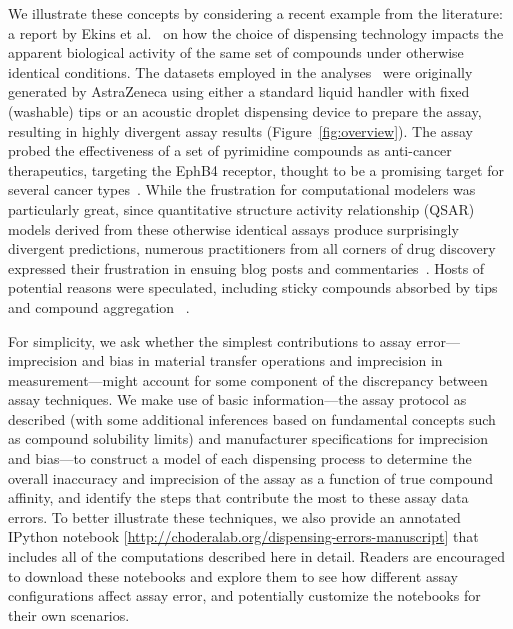 \documentclass[aps,pre,twocolumn,nofootinbib,superscriptaddress,linenumbers]{revtex4-1}
\begin{document}
We illustrate these concepts by considering a recent example from the literature: a report by Ekins et al.~\cite{ekins_dispensing_2013} on how the choice of dispensing technology impacts the apparent biological activity of the same set of compounds under otherwise identical conditions.
The datasets employed in the analyses~\cite{barlaam_novel_2009,barlaam_pyrimidine_2010} were originally generated by AstraZeneca using either a standard liquid handler with fixed (washable) tips or an acoustic droplet dispensing device to prepare the assay, resulting in highly divergent assay results (Figure~\ref{fig:overview}).
The assay probed the effectiveness of a set of pyrimidine compounds as anti-cancer therapeutics, targeting the EphB4 receptor, thought to be a promising target for several cancer types~\cite{xia_ephb4_2005,bardelle_inhibitors_2008}.
While the frustration for computational modelers was particularly great, since quantitative structure activity relationship (QSAR) models derived from these otherwise identical assays produce surprisingly divergent predictions, numerous practitioners from all corners of drug discovery expressed their frustration in ensuing blog posts and commentaries~\cite{lowe_drug_2015,evanko_serial_2013,ekins_what_2013}.
Hosts of potential reasons were speculated, including sticky compounds absorbed by tips ~\cite{palmgren_drug_2006} and compound aggregation ~\cite{feng_synergy_2006,feng_high-throughput_2005}.

For simplicity, we ask whether the simplest contributions to assay error---imprecision and bias in material transfer operations and imprecision in measurement---might account for some component of the discrepancy between assay techniques.
We make use of basic information---the assay protocol as described (with some additional inferences based on fundamental concepts such as compound solubility limits) and manufacturer specifications for imprecision and bias---to construct a model of each dispensing process to determine the overall inaccuracy and imprecision of the assay as a function of true compound affinity, and identify the steps that contribute the most to these assay data errors.
To better illustrate these techniques, we also provide an annotated IPython notebook [\url{http://choderalab.org/dispensing-errors-manuscript}] that includes all of the computations described here in detail.
Readers are encouraged to download these notebooks and explore them to see how different assay configurations affect assay error, and potentially customize the notebooks for their own scenarios.
\end{document}
